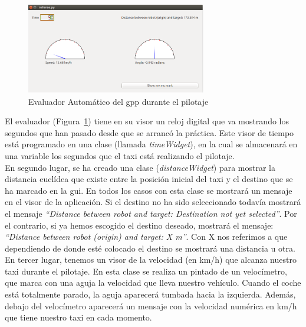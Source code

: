 \begin{figure}[H]
  \begin{center}
    \includegraphics[width=0.7\textwidth]{figures/GPP/referee2_gpp.png}
		\caption{Evaluador Automático del \acrshort{gpp} durante el pilotaje}
		\label{fig.referee2_gpp}
		\end{center}
\end{figure}

El evaluador (Figura~\ref{fig.referee2_gpp}) tiene en su visor un reloj digital que va mostrando los segundos que han pasado desde que se arrancó la práctica. Este visor de tiempo está programado en una clase (llamada \textit{timeWidget}), en la cual se almacenará en una variable los segundos que el taxi está realizando el pilotaje.\\

En segundo lugar, se ha creado una clase (\textit{distanceWidget}) para mostrar la distancia euclídea que existe entre la posición inicial del taxi y el destino que se ha marcado en la \acrshort{gui}. En todos los casos con esta clase se mostrará un mensaje en el visor de la aplicación. Si el destino no ha sido seleccionado todavía mostrará el mensaje \textit{“Distance between robot and target: Destination not yet selected''}. Por el contrario, si ya hemos escogido el destino deseado, mostrará el mensaje: \textit{``Distance between robot (origin) and target: X m”}. Con X nos referimos a que dependiendo de donde esté colocado el destino se mostrará una distancia u otra.\\

En tercer lugar, tenemos un visor de la velocidad (en km/h) que alcanza nuestro taxi durante el pilotaje. En esta clase se realiza un pintado de un velocímetro, que marca con una aguja la velocidad que lleva nuestro vehículo. Cuando el coche está totalmente parado, la aguja aparecerá tumbada hacia la izquierda. Además, debajo del velocímetro aparecerá un mensaje con la velocidad numérica en km/h que tiene nuestro taxi en cada momento.\\

